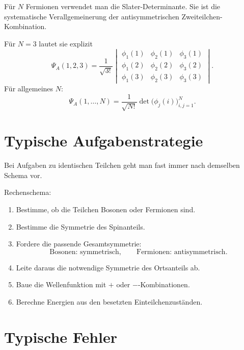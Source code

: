 Für \(N\) Fermionen verwendet man die Slater-Determinante. Sie ist die systematische Verallgemeinerung der antisymmetrischen Zweiteilchen-Kombination.

Für \(N=3\) lautet sie explizit
\[
    \Psi_A(1,2,3)
    =\frac{1}{\sqrt{3!}}
    \begin{vmatrix}
    \phi_1(1) & \phi_2(1) & \phi_3(1)\\
    \phi_1(2) & \phi_2(2) & \phi_3(2)\\
    \phi_1(3) & \phi_2(3) & \phi_3(3)
    \end{vmatrix}.
\]
Für allgemeines \(N\):
\[
    \Psi_A(1,\dots,N)
    =\frac{1}{\sqrt{N!}}
    \det\bigl(\phi_j(i)\bigr)_{i,j=1}^{N}.
\]

\section{Typische Aufgabenstrategie}

Bei Aufgaben zu identischen Teilchen geht man fast immer nach demselben Schema vor.

\begin{examtipbox}
Rechenschema:
\begin{enumerate}
    \item Bestimme, ob die Teilchen Bosonen oder Fermionen sind.
    \item Bestimme die Symmetrie des Spinanteils.
    \item Fordere die passende Gesamtsymmetrie:
    \[
        \text{Bosonen: symmetrisch},
        \qquad
        \text{Fermionen: antisymmetrisch}.
    \]
    \item Leite daraus die notwendige Symmetrie des Ortsanteils ab.
    \item Baue die Wellenfunktion mit \(+\) oder \(-\)-Kombinationen.
    \item Berechne Energien aus den besetzten Einteilchenzuständen.
\end{enumerate}
\end{examtipbox}

\section{Typische Fehler}

